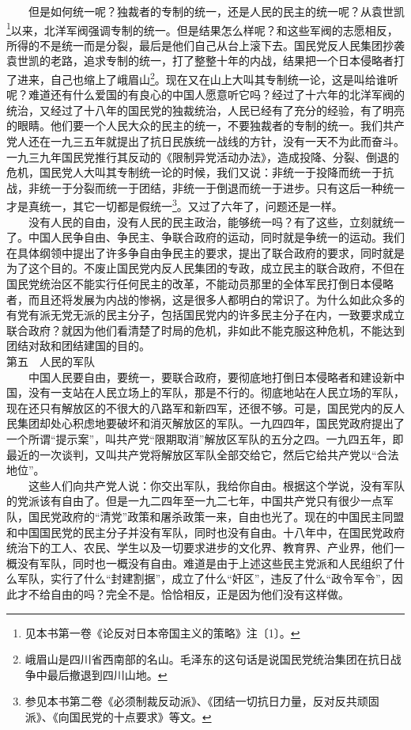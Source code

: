 \documentclass[cn,11pt,chinese]{elegantbook}
\begin{document}
　　但是如何统一呢？独裁者的专制的统一，还是人民的民主的统一呢？从袁世凯\footnote[17]{  见本书第一卷《论反对日本帝国主义的策略》注〔1〕。}以来，北洋军阀强调专制的统一。但是结果怎么样呢？和这些军阀的志愿相反，所得的不是统一而是分裂，最后是他们自己从台上滚下去。国民党反人民集团抄袭袁世凯的老路，追求专制的统一，打了整整十年的内战，结果把一个日本侵略者打了进来，自己也缩上了峨眉山\footnote[18]{  峨眉山是四川省西南部的名山。毛泽东的这句话是说国民党统治集团在抗日战争中最后撤退到四川山地。}。现在又在山上大叫其专制统一论，这是叫给谁听呢？难道还有什么爱国的有良心的中国人愿意听它吗？经过了十六年的北洋军阀的统治，又经过了十八年的国民党的独裁统治，人民已经有了充分的经验，有了明亮的眼睛。他们要一个人民大众的民主的统一，不要独裁者的专制的统一。我们共产党人还在一九三五年就提出了抗日民族统一战线的方针，没有一天不为此而奋斗。一九三九年国民党推行其反动的《限制异党活动办法》，造成投降、分裂、倒退的危机，国民党人大叫其专制统一论的时候，我们又说：非统一于投降而统一于抗战，非统一于分裂而统一于团结，非统一于倒退而统一于进步。只有这后一种统一才是真统一，其它一切都是假统一\footnote[19]{  参见本书第二卷《必须制裁反动派》、《团结一切抗日力量，反对反共顽固派》、《向国民党的十点要求》等文。}。又过了六年了，问题还是一样。\\
　　没有人民的自由，没有人民的民主政治，能够统一吗？有了这些，立刻就统一了。中国人民争自由、争民主、争联合政府的运动，同时就是争统一的运动。我们在具体纲领中提出了许多争自由争民主的要求，提出了联合政府的要求，同时就是为了这个目的。不废止国民党内反人民集团的专政，成立民主的联合政府，不但在国民党统治区不能实行任何民主的改革，不能动员那里的全体军民打倒日本侵略者，而且还将发展为内战的惨祸，这是很多人都明白的常识了。为什么如此众多的有党有派无党无派的民主分子，包括国民党内的许多民主分子在内，一致要求成立联合政府？就因为他们看清楚了时局的危机，非如此不能克服这种危机，不能达到团结对敌和团结建国的目的。\\
第五　人民的军队\\
　　中国人民要自由，要统一，要联合政府，要彻底地打倒日本侵略者和建设新中国，没有一支站在人民立场上的军队，那是不行的。彻底地站在人民立场的军队，现在还只有解放区的不很大的八路军和新四军，还很不够。可是，国民党内的反人民集团却处心积虑地要破坏和消灭解放区的军队。一九四四年，国民党政府提出了一个所谓“提示案”，叫共产党“限期取消”解放区军队的五分之四。一九四五年，即最近的一次谈判，又叫共产党将解放区军队全部交给它，然后它给共产党以“合法地位”。\\
　　这些人们向共产党人说：你交出军队，我给你自由。根据这个学说，没有军队的党派该有自由了。但是一九二四年至一九二七年，中国共产党只有很少一点军队，国民党政府的“清党”政策和屠杀政策一来，自由也光了。现在的中国民主同盟和中国国民党的民主分子并没有军队，同时也没有自由。十八年中，在国民党政府统治下的工人、农民、学生以及一切要求进步的文化界、教育界、产业界，他们一概没有军队，同时也一概没有自由。难道是由于上述这些民主党派和人民组织了什么军队，实行了什么“封建割据”，成立了什么“奸区”，违反了什么“政令军令”，因此才不给自由的吗？完全不是。恰恰相反，正是因为他们没有这样做。\\
\end{document}
